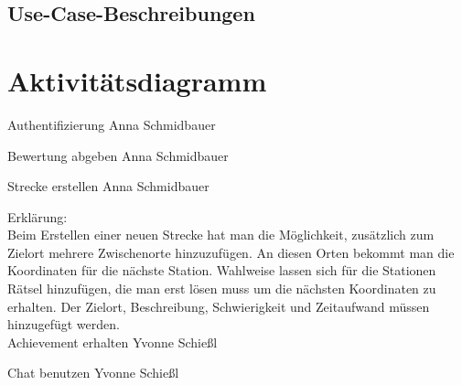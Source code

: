 \documentclass[a4paper, 12pp]{article}
\begin{document}
\subsection{Use-Case-Beschreibungen}
\section{Aktivitätsdiagramm}

{\Large Authentifizierung}
Anna Schmidbauer
\begin{figure}[H] 
\centering
	\fbox{\begin{minipage}{16cm} 
	\end{minipage}}
\end{figure}


{\Large Bewertung abgeben}
Anna Schmidbauer
\begin{figure}[H] 
\centering
	\fbox{\begin{minipage}{16cm} 
	\end{minipage}}
\end{figure}

{\Large Strecke erstellen}
Anna Schmidbauer
\begin{figure}[H] 
\centering
	\fbox{\begin{minipage}{16cm} 
	\end{minipage}}
\end{figure}

Erklärung:\\
Beim Erstellen einer neuen Strecke hat man die Möglichkeit, zusätzlich zum Zielort mehrere Zwischenorte hinzuzufügen. An diesen Orten bekommt man die Koordinaten für die nächste Station. Wahlweise lassen sich für die Stationen Rätsel hinzufügen, die man erst lösen muss um die nächsten Koordinaten zu erhalten. Der Zielort, Beschreibung, Schwierigkeit und Zeitaufwand müssen hinzugefügt werden.\\

{\Large Achievement erhalten}
Yvonne Schießl
\begin{figure}[H] 
\centering
	\fbox{\begin{minipage}{16cm} 
	\end{minipage}}
\end{figure}

{\Large Chat benutzen}
Yvonne Schießl
\begin{figure}[H] 
\centering
	\fbox{\begin{minipage}{16cm} 
	\end{minipage}}
\end{figure}
\end{document}
